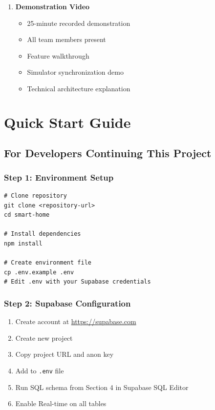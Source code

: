 \documentclass[12pt,a4paper]{article}
\begin{document}
\begin{enumerate}[leftmargin=*]
    \item \textcolor{required}{\textbf{Demonstration Video}}
    \begin{itemize}
        \item 25-minute recorded demonstration
        \item All team members present
        \item Feature walkthrough
        \item Simulator synchronization demo
        \item Technical architecture explanation
    \end{itemize}
\end{enumerate}


\newpage
\section{Quick Start Guide}

\subsection{For Developers Continuing This Project}

\subsubsection{Step 1: Environment Setup}
\begin{verbatim}
# Clone repository
git clone <repository-url>
cd smart-home

# Install dependencies
npm install

# Create environment file
cp .env.example .env
# Edit .env with your Supabase credentials
\end{verbatim}

\subsubsection{Step 2: Supabase Configuration}
\begin{enumerate}
    \item Create account at \url{https://supabase.com}
    \item Create new project
    \item Copy project URL and anon key
    \item Add to \texttt{.env} file
    \item Run SQL schema from Section 4 in Supabase SQL Editor
    \item Enable Real-time on all tables
\end{enumerate}
\end{document}
